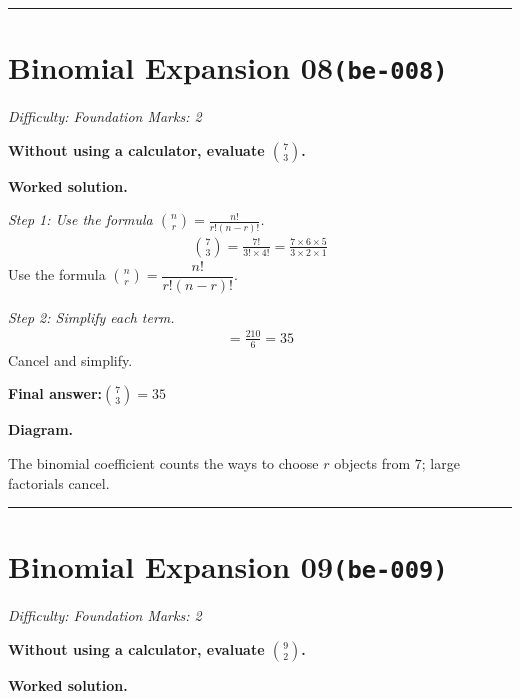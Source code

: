 \documentclass[11pt]{article}
\newcommand{\question}[1]{\par\medskip\noindent\textbf{#1}\par}
\begin{document}
\medskip\hrule

\section*{Binomial Expansion 08\quad\small\texttt{(be-008)}}
\textit{Difficulty: Foundation \quad\textbar\quad Marks: 2}

\question{Without using a calculator, evaluate \( \binom{7}{3} \).}

\textbf{Worked solution.}

\textit{Step 1: Use the formula \(\binom{n}{r} = \frac{n!}{r!(n-r)!}\).}
\[\begin{gathered}
\binom{7}{3} = \frac{7!}{3! \times 4!} = \frac{7 \times 6 \times 5}{3 \times 2 \times 1}
\end{gathered}\]
Use the formula \( \binom{n}{r} = \dfrac{n!}{r!(n-r)!} \).

\textit{Step 2: Simplify each term.}
\[\begin{gathered}
= \frac{210}{6} = 35
\end{gathered}\]
Cancel and simplify.

\begin{answerbox}
\textbf{Final answer:}\quad \(\displaystyle \binom{7}{3} = 35\)
\end{answerbox}
\textbf{Diagram.}

\begin{center}
\end{center}
\small The binomial coefficient counts the ways to choose $r$ objects from $7$; large factorials cancel.\normalsize

\medskip\hrule

\section*{Binomial Expansion 09\quad\small\texttt{(be-009)}}
\textit{Difficulty: Foundation \quad\textbar\quad Marks: 2}

\question{Without using a calculator, evaluate \( \binom{9}{2} \).}

\textbf{Worked solution.}
\end{document}
